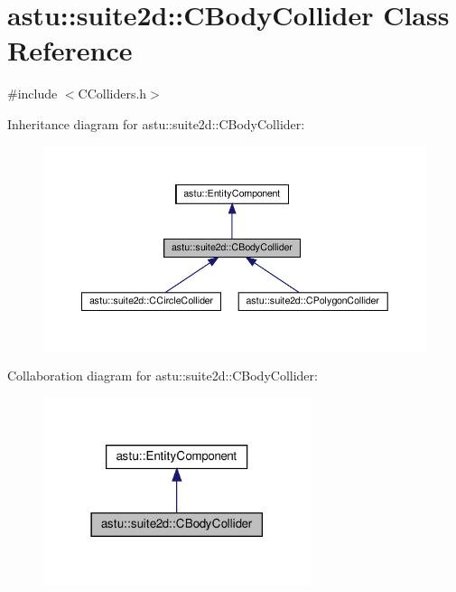 \hypertarget{classastu_1_1suite2d_1_1CBodyCollider}{}\section{astu\+:\+:suite2d\+:\+:C\+Body\+Collider Class Reference}
\label{classastu_1_1suite2d_1_1CBodyCollider}


{\ttfamily \#include $<$C\+Colliders.\+h$>$}



Inheritance diagram for astu\+:\+:suite2d\+:\+:C\+Body\+Collider\+:\nopagebreak
\begin{figure}[H]
\begin{center}
\leavevmode
\includegraphics[width=350pt]{classastu_1_1suite2d_1_1CBodyCollider__inherit__graph}
\end{center}
\end{figure}


Collaboration diagram for astu\+:\+:suite2d\+:\+:C\+Body\+Collider\+:\nopagebreak
\begin{figure}[H]
\begin{center}
\leavevmode
\includegraphics[width=222pt]{classastu_1_1suite2d_1_1CBodyCollider__coll__graph}
\end{center}
\end{figure}
